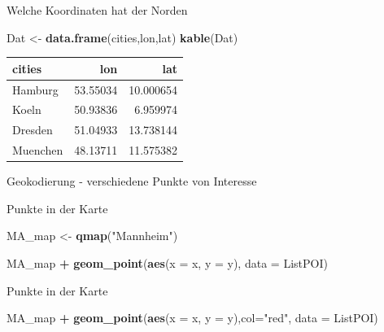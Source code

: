 \documentclass[ignorenonframetext,]{beamer}
\newenvironment{Shaded}{\begin{snugshade}}{\end{snugshade}}
\newcommand{\KeywordTok}[1]{\textcolor[rgb]{0.13,0.29,0.53}{\textbf{#1}}}
\newcommand{\DataTypeTok}[1]{\textcolor[rgb]{0.13,0.29,0.53}{#1}}
\newcommand{\StringTok}[1]{\textcolor[rgb]{0.31,0.60,0.02}{#1}}
\newcommand{\OperatorTok}[1]{\textcolor[rgb]{0.81,0.36,0.00}{\textbf{#1}}}
\newcommand{\NormalTok}[1]{#1}
\begin{document}
\begin{frame}[fragile]{Welche Koordinaten hat der Norden}

\begin{Shaded}
\begin{Highlighting}[]
\NormalTok{Dat <-}\StringTok{ }\KeywordTok{data.frame}\NormalTok{(cities,lon,lat)}
\KeywordTok{kable}\NormalTok{(Dat)}
\end{Highlighting}
\end{Shaded}

\begin{longtable}[]{@{}lrr@{}}
\toprule
cities & lon & lat\tabularnewline
\midrule
\endhead
Hamburg & 53.55034 & 10.000654\tabularnewline
Koeln & 50.93836 & 6.959974\tabularnewline
Dresden & 51.04933 & 13.738144\tabularnewline
Muenchen & 48.13711 & 11.575382\tabularnewline
\bottomrule
\end{longtable}

\end{frame}

\begin{frame}{Geokodierung - verschiedene Punkte von Interesse}

\end{frame}

\begin{frame}[fragile]{Punkte in der Karte}

\begin{Shaded}
\begin{Highlighting}[]
\NormalTok{MA_map <-}\StringTok{ }\KeywordTok{qmap}\NormalTok{(}\StringTok{"Mannheim"}\NormalTok{)}
\end{Highlighting}
\end{Shaded}

\begin{Shaded}
\begin{Highlighting}[]
\NormalTok{MA_map }\OperatorTok{+}
\KeywordTok{geom_point}\NormalTok{(}\KeywordTok{aes}\NormalTok{(}\DataTypeTok{x =}\NormalTok{ x, }\DataTypeTok{y =}\NormalTok{ y),}
\DataTypeTok{data =}\NormalTok{ ListPOI)}
\end{Highlighting}
\end{Shaded}

\end{frame}

\begin{frame}[fragile]{Punkte in der Karte}

\begin{Shaded}
\begin{Highlighting}[]
\NormalTok{MA_map }\OperatorTok{+}
\KeywordTok{geom_point}\NormalTok{(}\KeywordTok{aes}\NormalTok{(}\DataTypeTok{x =}\NormalTok{ x, }\DataTypeTok{y =}\NormalTok{ y),}\DataTypeTok{col=}\StringTok{"red"}\NormalTok{,}
\DataTypeTok{data =}\NormalTok{ ListPOI)}
\end{Highlighting}
\end{Shaded}

\end{frame}
\end{document}
